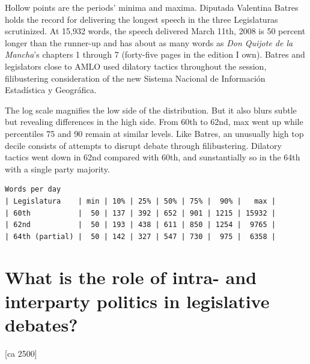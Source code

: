 \documentclass[letter,12pt]{article}
\begin{document}
Hollow points are the periods' minima and maxima. Diputada Valentina Batres holds the record for delivering the longest speech in the three Legislaturas scrutinized. At 15,932 words, the speech delivered March 11th, 2008 is 50 percent longer than the runner-up and has about as many words as \emph{Don Quijote de la Mancha}'s chapters 1 through 7 (forty-five pages in the edition I own). Batres and legislators close to AMLO used dilatory tactics throughout the session, filibustering consideration of the new Sistema Nacional de Información Estadística y Geográfica. 
  


The log scale magnifies the low side of the distribution. But it also blurs subtle but revealing differences in the high side. From 60th to 62nd, max went up while percentiles 75 and 90 remain at similar levels. Like Batres, an unusually high top decile consists of attempts to disrupt debate through filibustering. Dilatory tactics went down in 62nd compared with 60th, and sunstantially so in the 64th with a single party majority.

\singlespacing
\begin{footnotesize}
\begin{verbatim}
Words per day
| Legislatura    | min | 10% | 25% | 50% | 75% |  90% |   max |
| 60th           |  50 | 137 | 392 | 652 | 901 | 1215 | 15932 |
| 62nd           |  50 | 193 | 438 | 611 | 850 | 1254 |  9765 |
| 64th (partial) |  50 | 142 | 327 | 547 | 730 |  975 |  6358 |
\end{verbatim}
\end{footnotesize}
\doublespacing


\section{What is the role of intra- and interparty politics in legislative debates?} [ca 2500]
\end{document}
